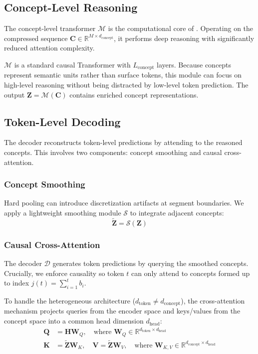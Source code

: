 \subsection{Concept-Level Reasoning}
\label{sec:backbone}

The concept-level transformer $\mathcal{M}$ is the computational core of \ModelName{}. Operating on the compressed sequence $\mathbf{C} \in \mathbb{R}^{M \times d_{\text{concept}}}$, it performs deep reasoning with significantly reduced attention complexity.

$\mathcal{M}$ is a standard causal Transformer with $L_{\text{concept}}$ layers. Because concepts represent semantic units rather than surface tokens, this module can focus on high-level reasoning without being distracted by low-level token prediction. The output $\mathbf{Z} = \mathcal{M}(\mathbf{C})$ contains enriched concept representations.

\subsection{Token-Level Decoding}
\label{sec:decoding}

The decoder reconstructs token-level predictions by attending to the reasoned concepts. This involves two components: concept smoothing and causal cross-attention.

\subsubsection{Concept Smoothing}

Hard pooling can introduce discretization artifacts at segment boundaries. We apply a lightweight smoothing module $\mathcal{S}$ to integrate adjacent concepts:
\begin{equation}
    \tilde{\mathbf{Z}} = \mathcal{S}(\mathbf{Z})
\end{equation}

\subsubsection{Causal Cross-Attention}

The decoder $\mathcal{D}$ generates token predictions by querying the smoothed concepts. Crucially, we enforce causality so token $t$ can only attend to concepts formed up to index $j(t) = \sum_{i=1}^t b_i$.

To handle the heterogeneous architecture ($d_{\text{token}} \neq d_{\text{concept}}$), the cross-attention mechanism projects queries from the encoder space and keys/values from the concept space into a common head dimension $d_{\text{head}}$:
\begin{align}
    \mathbf{Q} &= \mathbf{H}\mathbf{W}_Q, \quad \text{where } \mathbf{W}_Q \in \mathbb{R}^{d_{\text{token}} \times d_{\text{head}}} \\
    \mathbf{K} &= \tilde{\mathbf{Z}}\mathbf{W}_K, \quad \mathbf{V} = \tilde{\mathbf{Z}}\mathbf{W}_V, \quad \text{where } \mathbf{W}_{K,V} \in \mathbb{R}^{d_{\text{concept}} \times d_{\text{head}}}
\end{align}

